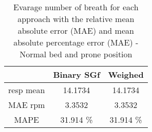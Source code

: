 \begin{table}[H]
    \centering
    \begin{tabular}{|c|c|c|}
    \hline 
    & Binary SGf & Weighed  \\ 
    \hline
    resp mean & 14.1734  & 14.1734 \\
    MAE rpm & 3.3532  &     3.3532  \\ 
    MAPE & 31.914 \% & 31.914 \% \\ 
    \hline 
    \end{tabular}
    \caption{Evarage number of breath for each approach with the relative mean
    absolute error (MAE) and mean absolute percentage error (MAE) - Normal bed
    and prone position}
    \label{tab:ProneNormalStillMetricssg}    
\end{table}
    